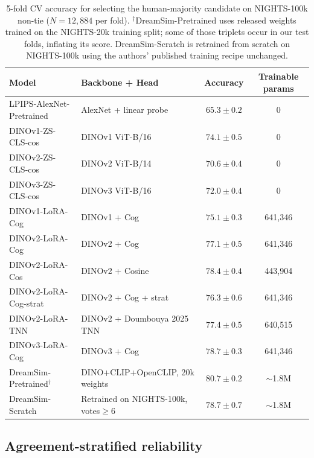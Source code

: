 \documentclass{article}
\begin{document}
\begin{table}[ht]
\caption{5-fold CV accuracy for selecting the human-majority candidate on NIGHTS-100k non-tie ($N=12{,}884$ per fold). $^\dagger$DreamSim-Pretrained uses released weights trained on the NIGHTS-20k training split; some of those triplets occur in our test folds, inflating its score. DreamSim-Scratch is retrained from scratch on NIGHTS-100k using the authors' published training recipe unchanged.}
\label{tab:main}
\centering
\small
\begin{tabular}{llcc}
\toprule
Model & Backbone + Head & Accuracy & Trainable params \\
\midrule
LPIPS-AlexNet-Pretrained & AlexNet + linear probe & $65.3 \pm 0.2$ & 0 \\
DINOv1-ZS-CLS-cos & DINOv1 ViT-B/16 & $\mathbf{74.1 \pm 0.5}$ & 0 \\
DINOv2-ZS-CLS-cos & DINOv2 ViT-B/14 & $70.6 \pm 0.4$ & 0 \\
DINOv3-ZS-CLS-cos & DINOv3 ViT-B/16 & $72.0 \pm 0.4$ & 0 \\
\midrule
DINOv1-LoRA-Cog & DINOv1 + Cog & $75.1 \pm 0.3$ & 641{,}346 \\
DINOv2-LoRA-Cog & DINOv2 + Cog & $77.1 \pm 0.5$ & 641{,}346 \\
DINOv2-LoRA-Cos & DINOv2 + Cosine & $78.4 \pm 0.4$ & 443{,}904 \\
DINOv2-LoRA-Cog-strat & DINOv2 + Cog + strat & $76.3 \pm 0.6$ & 641{,}346 \\
DINOv2-LoRA-TNN & DINOv2 + Doumbouya 2025 TNN & $77.4 \pm 0.5$ & 640{,}515 \\
DINOv3-LoRA-Cog & DINOv3 + Cog & $\mathbf{78.7 \pm 0.3}$ & 641{,}346 \\
\midrule
DreamSim-Pretrained$^\dagger$ & DINO+CLIP+OpenCLIP, 20k weights & $80.7 \pm 0.2$ & $\sim$1.8M \\
DreamSim-Scratch & Retrained on NIGHTS-100k, votes$\geq$6 & $78.7 \pm 0.7$ & $\sim$1.8M \\
\bottomrule
\end{tabular}
\end{table}

\subsection{Agreement-stratified reliability}
\end{document}
